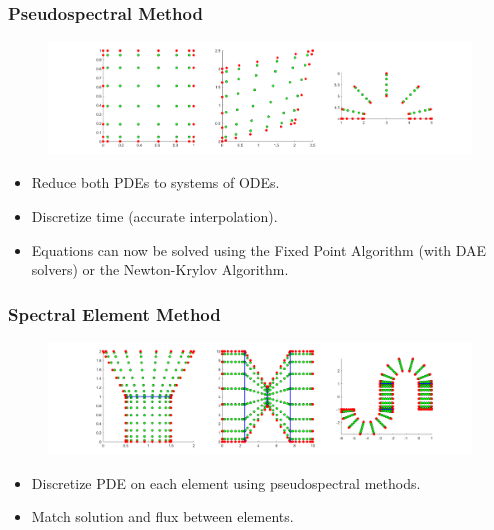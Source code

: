 \documentclass[aspectratio=169,xcolor=dvipsnames]{beamer}
\begin{document}
\begin{frame}
	\frametitle{Pseudospectral Method}
\begin{figure}
	\includegraphics[width=15cm]{Shapes1.png}
\end{figure}
    \begin{itemize}
    	\item Reduce both PDEs to systems of ODEs.
    	\item Discretize time (accurate interpolation).
    	\item Equations can now be solved using the Fixed Point Algorithm (with DAE solvers) or the Newton-Krylov Algorithm.
    \end{itemize}
	
\end{frame}
\begin{frame}
	\frametitle{Spectral Element Method}
	\begin{figure}
		\includegraphics[width=15cm]{MultiShapes.png}
	\end{figure}
		\begin{itemize}
			\item Discretize PDE on each element using pseudospectral methods.
			\item Match solution and flux between elements.
		\end{itemize}
		

	
	
\end{frame}
\end{document}
